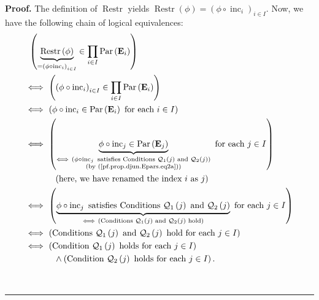 \documentclass[numbers=enddot,12pt,final,onecolumn,notitlepage,abstracton]{scrartcl}
\theoremstyle{definition}
\newenvironment{proof}[1][Proof]{\noindent\textbf{#1.} }{\ \rule{0.5em}{0.5em}}
\let\prodnonlimits\prod
\renewcommand{\prod}{\prodnonlimits\limits}
\newenvironment{verlong}{}{}
\begin{document}
\begin{verlong}
\begin{footnotesize}
\begin{proof}
The definition of $\operatorname*{Restr}$ yields $\operatorname*{Restr}\left(
\phi\right)  =\left(  \phi\circ\operatorname*{inc}\nolimits_{i}\right)  _{i\in
I}$. Now, we have the following chain of logical equivalences:%
\begin{align}
&  \ \left(  \underbrace{\operatorname*{Restr}\left(  \phi\right)  }_{=\left(
\phi\circ\operatorname*{inc}\nolimits_{i}\right)  _{i\in I}}\in\prod_{i\in
I}\operatorname*{Par}\left(  \mathbf{E}_{i}\right)  \right) \nonumber\\
&  \Longleftrightarrow\ \left(  \left(  \phi\circ\operatorname*{inc}%
\nolimits_{i}\right)  _{i\in I}\in\prod_{i\in I}\operatorname*{Par}\left(
\mathbf{E}_{i}\right)  \right) \nonumber\\
&  \Longleftrightarrow\ \left(  \phi\circ\operatorname*{inc}\nolimits_{i}%
\in\operatorname*{Par}\left(  \mathbf{E}_{i}\right)  \text{ for each }i\in
I\right) \nonumber\\
&  \Longleftrightarrow\ \left(  \underbrace{\phi\circ\operatorname*{inc}%
\nolimits_{j}\in\operatorname*{Par}\left(  \mathbf{E}_{j}\right)
}_{\substack{\Longleftrightarrow\ \left(  \phi\circ\operatorname*{inc}%
\nolimits_{j}\text{ satisfies Conditions }\mathcal{Q}_{1}\left(  j\right)
\text{ and }\mathcal{Q}_{2}\left(  j\right)  \right)  \\\text{(by
(\ref{pf.prop.djun.Epars.eq2a}))}}}\text{ for each }j\in I\right) \nonumber\\
&  \ \ \ \ \ \ \ \ \ \ \left(  \text{here, we have renamed the index }i\text{
as }j\right) \nonumber\\
&  \Longleftrightarrow\ \left(  \underbrace{\phi\circ\operatorname*{inc}%
\nolimits_{j}\text{ satisfies Conditions }\mathcal{Q}_{1}\left(  j\right)
\text{ and }\mathcal{Q}_{2}\left(  j\right)  }_{\Longleftrightarrow\ \left(
\text{Conditions }\mathcal{Q}_{1}\left(  j\right)  \text{ and }\mathcal{Q}%
_{2}\left(  j\right)  \text{ hold}\right)  }\text{ for each }j\in I\right)
\nonumber\\
&  \Longleftrightarrow\ \left(  \text{Conditions }\mathcal{Q}_{1}\left(
j\right)  \text{ and }\mathcal{Q}_{2}\left(  j\right)  \text{ hold for each
}j\in I\right) \nonumber\\
&  \Longleftrightarrow\ \left(  \text{Condition }\mathcal{Q}_{1}\left(
j\right)  \text{ holds for each }j\in I\right) \nonumber\\
&  \ \ \ \ \ \ \ \ \ \ \wedge\left(  \text{Condition }\mathcal{Q}_{2}\left(
j\right)  \text{ holds for each }j\in I\right)  .
\label{pf.prop.djun.Epars.eq2b}%
\end{align}



\end{proof}
\end{footnotesize}
\end{verlong}
\end{document}
